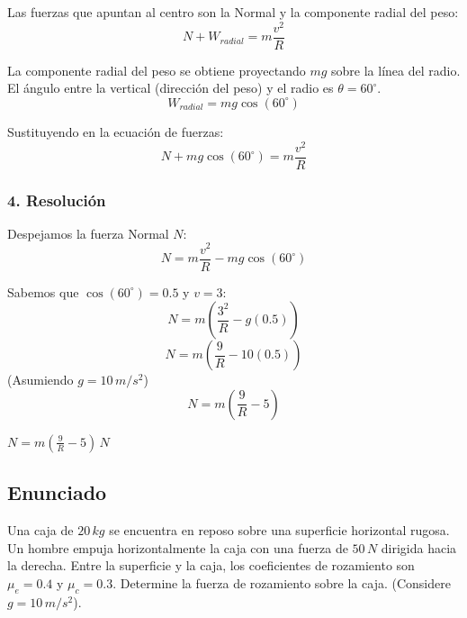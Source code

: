 \documentclass[12pt, a4paper]{article}
\begin{document}
Las fuerzas que apuntan al centro son la Normal y la componente radial del peso:
$$ N + W_{radial} = m \frac{v^2}{R} $$

La componente radial del peso se obtiene proyectando $mg$ sobre la línea del radio. El ángulo entre la vertical (dirección del peso) y el radio es $\theta = 60^\circ$.
$$ W_{radial} = mg \cos(60^\circ) $$

Sustituyendo en la ecuación de fuerzas:
$$ N + mg \cos(60^\circ) = m \frac{v^2}{R} $$

\subsubsection*{4. Resolución}
Despejamos la fuerza Normal $N$:
$$ N = m \frac{v^2}{R} - mg \cos(60^\circ) $$

Sabemos que $\cos(60^\circ) = 0.5$ y $v = 3$:
$$ N = m \left( \frac{3^2}{R} - g(0.5) \right) $$
$$ N = m \left( \frac{9}{R} - 10(0.5) \right) $$
(Asumiendo $g=10\,\si{m/s^2}$)
$$ N = m \left( \frac{9}{R} - 5 \right) $$

\begin{tcolorbox}[colback=green!5!white, colframe=green!50!black, title=Respuesta Final]
\centering \Large $N = m \left( \frac{9}{R} - 5 \right) \, \si{N}$
\end{tcolorbox}

\newpage

\subsection*{Enunciado}
Una caja de $20 \, \si{kg}$ se encuentra en reposo sobre una superficie horizontal rugosa. Un hombre empuja horizontalmente la caja con una fuerza de $50 \, \si{N}$ dirigida hacia la derecha. Entre la superficie y la caja, los coeficientes de rozamiento son $\mu_e = 0.4$ y $\mu_c = 0.3$. Determine la fuerza de rozamiento sobre la caja. (Considere $g = 10 \, \si{m/s^2}$).

\begin{center}
\end{center}
\end{document}
